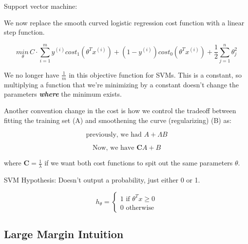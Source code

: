\documentclass{article}
\begin{document}
\begin{mybox}

Support vector machine:

We now replace the smooth curved logistic regression cost function with a linear step function.

\begin{equation}
    \underset{\theta}{min \,} C \cdot \sum_{i=1}^m y^{(i)} cost_1 (\theta^T x^{(i)}) + (1 - y^{(i)}) cost_0 (\theta^T x^{(i)}) + \frac{1}{2} \sum_{j=1}^n \theta_j^2
\end{equation}

We no longer have $\frac{1}{m}$ in this objective function for SVMs. This is a constant, so multiplying a function that we're minimizing by a constant doesn't change the parameters \textit{\textbf{where}} the minimum exists.

\hspace{}


Another convention change in the cost is how we control the tradeoff between fitting the training set (A) and smoothening the curve (regularizing) (B) as:

\begin{equation}
    \text{previously, we had } A + {\Lambda} B
\end{equation}

\begin{equation}
    \text{Now, we have } \textbf{C} A + B
\end{equation}

where $\textbf{C} = \frac{1}{\lambda}$ if we want both cost functions to spit out the same parameters $\theta$.
\end{mybox}

\begin{mybox}
SVM Hypothesis: Doesn't output a probability, just either 0 or 1.

\begin{equation}
    h_{\theta} = \left\{
    \begin{array}{ll}
    1 \text{ if } \theta^T x \geq 0 \\
    0 \text{ otherwise}
    \end{array} \right.
\end{equation}

\end{mybox}


\subsection{Large Margin Intuition}
\end{document}
